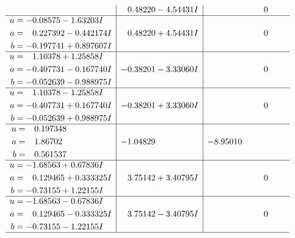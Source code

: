 \documentclass[1p]{elsarticle_modified}
\theoremstyle{definition}
\begin{document}
$$\begin{array}{c|c|c}
 & \phantom{-}0.48220 - 4.54431 I & \phantom{-0.000000 } 0 \\ \hline\begin{aligned}
u &= -0.08575 - 1.63203 I \\
a &= \phantom{-}0.227392 - 0.442174 I \\
b &= -0.197741 + 0.897607 I\end{aligned}
 & \phantom{-}0.48220 + 4.54431 I & \phantom{-0.000000 } 0 \\ \hline\begin{aligned}
u &= \phantom{-}1.10378 + 1.25858 I \\
a &= -0.407731 - 0.167740 I \\
b &= -0.052639 - 0.988975 I\end{aligned}
 & -0.38201 - 3.33060 I & \phantom{-0.000000 } 0 \\ \hline\begin{aligned}
u &= \phantom{-}1.10378 - 1.25858 I \\
a &= -0.407731 + 0.167740 I \\
b &= -0.052639 + 0.988975 I\end{aligned}
 & -0.38201 + 3.33060 I & \phantom{-0.000000 } 0 \\ \hline\begin{aligned}
u &= \phantom{-}0.197348\phantom{ +0.000000I} \\
a &= \phantom{-}1.86702\phantom{ +0.000000I} \\
b &= \phantom{-}0.561537\phantom{ +0.000000I}\end{aligned}
 & -1.04829\phantom{ +0.000000I} & -8.95010\phantom{ +0.000000I} \\ \hline\begin{aligned}
u &= -1.68563 + 0.67836 I \\
a &= \phantom{-}0.129465 + 0.333325 I \\
b &= -0.73155 + 1.22155 I\end{aligned}
 & \phantom{-}3.75142 + 3.40795 I & \phantom{-0.000000 } 0 \\ \hline\begin{aligned}
u &= -1.68563 - 0.67836 I \\
a &= \phantom{-}0.129465 - 0.333325 I \\
b &= -0.73155 - 1.22155 I\end{aligned}
 & \phantom{-}3.75142 - 3.40795 I & \phantom{-0.000000 } 0\\
 \hline 
 \end{array}$$\newpage\newpage\renewcommand{\arraystretch}{1}
\end{document}
